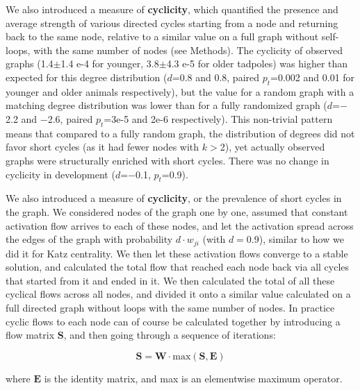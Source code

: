 

We also introduced a measure of \textbf{cyclicity}, which quantified the presence and average strength of various directed cycles starting from a node and returning back to the same node, relative to a similar value on a full graph without self-loops, with the same number of nodes (see Methods). The cyclicity of observed graphs (1.4$\pm$1.4 e-4 for younger, 3.8$\pm$4.3 e-5 for older tadpoles) was higher than expected for this degree distribution ($d$=0.8 and 0.8, paired $p_t$=0.002 and 0.01 for younger and older animals respectively), but the value for a random graph with a matching degree distribution was lower than for a fully randomized graph ($d$=$-$2.2 and $-$2.6, paired $p_t$=3e-5 and 2e-6 respectively). This non-trivial pattern means that compared to a fully random graph, the distribution of degrees did not favor short cycles (as it had fewer nodes with $k>$2), yet actually observed graphs were structurally enriched with short cycles. There was no change in cyclicity in development ($d$=$-$0.1, $p_t$=0.9).

We also introduced a measure of \textbf{cyclicity}, or the prevalence of short cycles in the graph. We considered nodes of the graph one by one, assumed that constant activation flow arrives to each of these nodes, and let the activation spread across the edges of the graph with probability $d \cdot w_{ji}$ (with $d = $0.9), similar to how we did it for Katz centrality. We then let these activation flows converge to a stable solution, and calculated the total flow that reached each node back via all cycles that started from it and ended in it. We then calculated the total of all these cyclical flows across all nodes, and divided it onto a similar value calculated on a full directed graph without loops with the same number of nodes. In practice cyclic flows to each node can of course be calculated together by introducing a flow matrix $\textbf{S}$, and then going through a sequence of iterations: 

$$\textbf{S} = \textbf{W} \cdot \text{max}(\textbf{S} , \textbf{E}) $$

where $\textbf{E}$ is the identity matrix, and max is an elementwise maximum operator.



